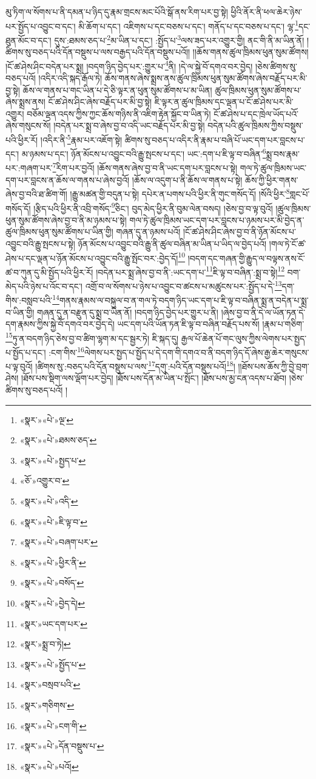 མུ་ཏིག་ལ་སོགས་པ་ནི་དམན་པ་ཉིད་དུ་རྣམ་གྲངས་མང་པོའི་སྒོ་ནས་རིག་པར་བྱ་སྟེ། ཕྱིའི་ནོར་ནི་ཕལ་ཆེར་ཉེས་པར་སྤྱོད་པ་འབྱུང་བ་དང་། མི་ཆོག་པ་དང་། འཇིགས་པ་དང་བཅས་པ་དང་། གནོད་པ་དང་བཅས་པ་དང་། ལྷ་\footnote{«སྣར་»«པེ་»ལྔ་}དང་ཐུན་མོང་བ་དང་། དུས་:ཐམས་ཅད་པ་\footnote{«སྣར་»«པེ་»ཐམས་ཅད་}མ་ཡིན་པ་དང་། :སྤྱོད་པ་\footnote{«སྣར་»«པེ་»སྤྱད་པ་}ལས་ཟད་པར་འགྱུར་གྱི། ནང་གི་ནི་མ་ཡིན་ནོ། །ཚིགས་སུ་བཅད་པའི་དོན་བསྡུས་པ་ལས་བརྒྱད་པའི་དོན་བསྡུས་པའོ།། །།ཆོས་གནས་ཚུལ་ཁྲིམས་ཕུན་སུམ་ཚོགས། །ངོ་ཚ་ཤེས་ཤིང་བདེན་པར་སྨྲ། །བདག་ཉིད་བྱེད་པར་:གྱུར་པ་\footnote{«ཅོ་»འགྱུར་བ་}ནི། །དེ་ལ་སྐྱེ་བོ་དགའ་བར་བྱེད། །ཅེས་ཚིགས་སུ་བཅད་པའོ། །འདིར་འདི་སྐད་རྒོལ་ཏེ། ཆོས་གནས་ཞེས་སྨྲས་ནས་ཚུལ་ཁྲིམས་ཕུན་སུམ་ཚོགས་ཞེས་བརྗོད་པར་མི་བྱ་སྟེ། ཆོས་ལ་གནས་པ་གང་ཡིན་པ་དེ་ཅི་ལྟར་ན་ཕུན་སུམ་ཚོགས་པ་མ་ཡིན། ཚུལ་ཁྲིམས་ཕུན་སུམ་ཚོགས་པ་ཞེས་སྨྲས་ནས། ངོ་ཚ་ཤེས་ཤིང་ཞེས་བརྗོད་པར་མི་བྱ་སྟེ། ཇི་ལྟར་ན་ཚུལ་ཁྲིམས་དང་ལྡན་པ་ངོ་ཚ་ཤེས་པར་མི་འགྱུར། བཅོམ་ལྡན་འདས་ཀྱིས་ཀྱང་ཆོས་གཉིས་ནི་འཇིག་རྟེན་སྐྱོང་བ་ཡིན་ཏེ། ངོ་ཚ་ཤེས་པ་དང་ཁྲེལ་ཡོད་པའོ་ཞེས་གསུངས་སོ། །བདེན་པར་སྨྲ་བ་ཞེས་བྱ་བ་འདི་ཡང་བརྗོད་པར་མི་བྱ་སྟེ། བདེན་པའི་ཚུལ་ཁྲིམས་ཀྱིས་བསྡུས་པའི་ཕྱིར་རོ། །འདིར་ནི་\footnote{«སྣར་»«པེ་»འདི་}རྣམ་པར་འཇོག་སྟེ། ཚིགས་སུ་བཅད་པ་འདིར་ནི་རྣམ་པ་བཞི་པོ་ཡང་དག་པར་བླངས་པ་དང་། མ་ཉམས་པ་དང་། ཉོན་མོངས་པ་འབྱུང་བའི་རྒྱུ་སྤངས་པ་དང་། ཡང་:དག་པ་ཇི་ལྟ་བ་བཞིན་\footnote{«སྣར་»«པེ་»ཇི་ལྟ་བ་}སྨྲ་བས་རྣམ་པར་:གཞག་པར་\footnote{«སྣར་»«པེ་»བཞག་པར་}རིག་པར་བྱའོ། །ཆོས་གནས་ཞེས་བྱ་བ་ནི་ཡང་དག་པར་བླངས་པ་སྟེ། གལ་ཏེ་ཚུལ་ཁྲིམས་ཡང་དག་པར་བླངས་ན་ཆོས་ལ་གནས་པ་ཞེས་བྱའོ། །ཆོས་ལ་འདུག་པ་ནི་ཆོས་ལ་གནས་པ་སྟེ། ཆོས་ཀྱི་ཕྱིར་གནས་ཞེས་བྱ་བའི་ཐ་ཚིག་གོ། །རྒྱུ་མཚན་གྱི་བདུན་པ་སྟེ། དཔེར་ན་པགས་པའི་ཕྱིར་ནི་གུང་གསོད་དོ། །སོའི་ཕྱིར་\footnote{«སྣར་»«པེ་»ཕྱིར་ནི་}གླང་པོ་གསོད་དོ། །རྩིད་པའི་ཕྱིར་ནི་འབྲི་གསོད་\footnote{«སྣར་»«པེ་»བསོད་}ཅིང་། བུད་མེད་ཕྱིར་ནི་བུམ་ལེན་བསད། །ཅེས་བྱ་བ་ལྟ་བུའོ། །ཚུལ་ཁྲིམས་ཕུན་སུམ་ཚོགས་ཞེས་བྱ་བ་ནི་མ་ཉམས་པ་སྟེ། གལ་ཏེ་ཚུལ་ཁྲིམས་ཡང་དག་པར་བླངས་པ་ཉམས་པར་མི་བྱེད་ན་ཚུལ་ཁྲིམས་ཕུན་སུམ་ཚོགས་པ་ཡིན་གྱི། གཞན་དུ་ན་ཉམས་པའོ། །ངོ་ཚ་ཤེས་ཤིང་ཞེས་བྱ་བ་ནི་ཉོན་མོངས་པ་འབྱུང་བའི་རྒྱུ་སྤངས་པ་སྟེ། ཉོན་མོངས་པ་འབྱུང་བའི་རྒྱུ་ནི་ཚུལ་བཞིན་མ་ཡིན་པ་ཡིད་ལ་བྱེད་པའོ། །གལ་ཏེ་ངོ་ཚ་ཤེས་པ་དང་ལྡན་པ་ཉོན་མོངས་པ་འབྱུང་བའི་རྒྱུ་སྤོང་བར་:བྱེད་དོ།\footnote{«སྣར་»«པེ་»བྱེད་དེ།} །བདག་དང་གཞན་གྱི་རྒྱུད་ལ་བལྟས་ནས་ངོ་ཚ་བ་ཀུན་དུ་མི་སྤྱོད་པའི་ཕྱིར་རོ། །བདེན་པར་སྨྲ་ཞེས་བྱ་བ་ནི་:ཡང་དག་པ་\footnote{«སྣར་»ཡང་དག་པར་}ཇི་ལྟ་བ་བཞིན་:སྨྲ་བ་སྟེ།\footnote{«སྣར་»སྨྲ་བ་ཏེ།} བག་མེད་པའི་ཉེས་པ་འོང་བ་དང་། འགྲོ་བ་ལ་སོགས་པ་ཉེས་པ་འབྱུང་བ་ཚངས་པ་མཚུངས་པར་:སྤྱོད་པ་དེ་\footnote{«སྣར་»«པེ་»སྤྱོད་པ་}དག་གིས་:བསླབ་པའི་\footnote{«སྣར་»བསྲབ་པའི་}གནས་རྣམས་ལ་བསྐུལ་བ་ན་གལ་ཏེ་བདག་ཉིད་ཡང་དག་པ་ཇི་ལྟ་བ་བཞིན་སྨྲ་ན་བདེན་པ་སྨྲ་བ་ཡིན་གྱི། གཞན་དུ་ན་བརྫུན་དུ་སྨྲ་བ་ཡིན་ནོ། །བདག་ཉིད་བྱེད་པར་གྱུར་པ་ནི། །ཞེས་བྱ་བ་ནི་དེ་ལ་ཡོན་ཏན་དེ་དག་རྣམས་ཀྱིས་སྐྱེ་བོ་དགའ་བར་བྱེད་དེ། ཡང་དག་པའི་ཡོན་ཏན་ཇི་ལྟ་བ་བཞིན་བརྗོད་པས་སོ། །རྣམ་པ་གཅིག་\footnote{«སྣར་»གཅིགས་}ཏུ་ན་བདག་ཉིད་ཅེས་བྱ་བ་ཚིག་ལྷག་མ་དང་སྦྱར་ཏེ། ཇི་སྐད་དུ། རྒྱལ་པོ་ཆེན་པོ་གང་ལུས་ཀྱིས་ལེགས་པར་སྤྱད་པ་སྤྱོད་པ་དང་། :ངག་གིས་\footnote{«སྣར་»«པེ་»ངག་གི་}ལེགས་པར་སྤྱད་པ་སྤྱོད་པ་དེ་དག་གི་དགའ་བ་ནི་བདག་ཉིད་དོ་ཞེས་རྒྱ་ཆེར་གསུངས་པ་ལྟ་བུའོ། །ཚིགས་སུ་:བཅད་པའི་དོན་བསྡུས་པ་ལས་\footnote{«སྣར་»«པེ་»དོན་བསྡུས་པ་}དགུ་:པའི་དོན་བསྡུས་པའོ།\footnote{«སྣར་»«པེ་»པའོ།}། །།ཐོས་པས་ཆོས་ཀྱི་བྱེ་བྲག་ཤེས། །ཐོས་པས་སྡིག་ལས་ལྡོག་པར་བྱེད། །ཐོས་པས་དོན་མ་ཡིན་པ་སྤོང་། །ཐོས་པས་མྱ་ངན་འདས་པ་ཐོབ། །ཅེས་ཚིགས་སུ་བཅད་པའོ། །
